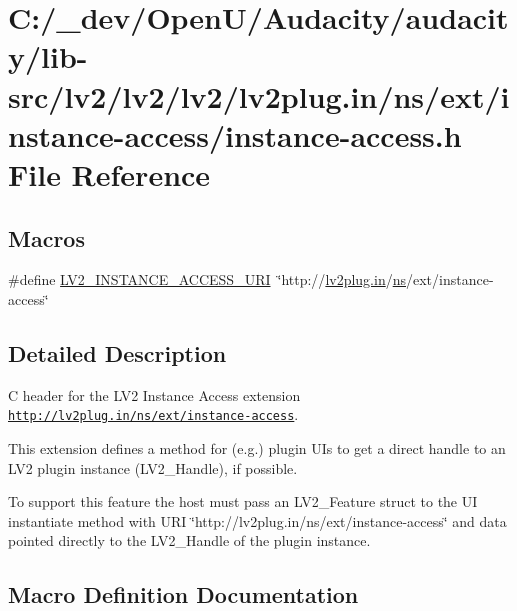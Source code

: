 \hypertarget{instance-access_8h}{}\section{C\+:/\+\_\+dev/\+Open\+U/\+Audacity/audacity/lib-\/src/lv2/lv2/lv2/lv2plug.in/ns/ext/instance-\/access/instance-\/access.h File Reference}
\label{instance-access_8h}
\subsection*{Macros}
\begin{DoxyCompactItemize}
\item 
\#define \hyperlink{instance-access_8h_af1ac86ed4647658b93f24c12c634d267}{L\+V2\+\_\+\+I\+N\+S\+T\+A\+N\+C\+E\+\_\+\+A\+C\+C\+E\+S\+S\+\_\+\+U\+RI}~\char`\"{}http\+://\hyperlink{latency_8c_a7d946209d777cb95fe30364b8d321207}{lv2plug.\+in}/\hyperlink{xmltok_8c_ab6aec1346fb6c7b2733f0f73c9536ad2}{ns}/ext/instance-\/access\char`\"{}
\end{DoxyCompactItemize}


\subsection{Detailed Description}
C header for the L\+V2 Instance Access extension \href{http://lv2plug.in/ns/ext/instance-access}{\tt http\+://lv2plug.\+in/ns/ext/instance-\/access}.

This extension defines a method for (e.\+g.) plugin U\+Is to get a direct handle to an L\+V2 plugin instance (L\+V2\+\_\+\+Handle), if possible.

To support this feature the host must pass an L\+V2\+\_\+\+Feature struct to the UI instantiate method with U\+RI \char`\"{}http\+://lv2plug.\+in/ns/ext/instance-\/access\char`\"{} and data pointed directly to the L\+V2\+\_\+\+Handle of the plugin instance. 

\subsection{Macro Definition Documentation}
